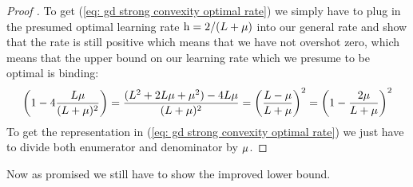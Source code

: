 \begin{proof}[Proof {\parencite[Theorem 2.1.15]{nesterovLecturesConvexOptimization2018}}]
	To get (\ref{eq: gd strong convexity optimal rate}) we simply have to plug
	in the presumed optimal learning rate \(\text{h}=2/(L+\mu)\) into
	our general rate and show that the rate is still positive which means that
	we have not overshot zero, which means that the upper bound on our learning
	rate which we presume to be optimal is binding:
	\begin{align*}
		\left(1- 4 \frac{L\mu}{(L+\mu)^2}\right)
		= \frac{(L^2 + 2L\mu + \mu^2) - 4 L\mu}{(L+\mu)^2}
		= \left(\frac{L-\mu}{L+\mu}\right)^2
		= \left(1-\frac{2\mu}{L+\mu}\right)^2
	\end{align*}
	To get the representation in (\ref{eq: gd strong convexity optimal rate}) we
	just have to divide both enumerator and denominator by \(\mu\).
\end{proof}

Now as promised we still have to show the improved lower bound.

